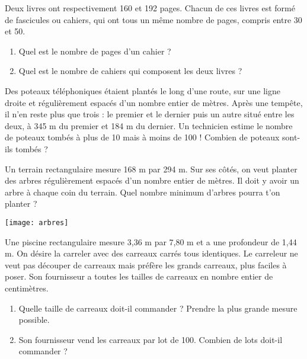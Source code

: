 \begin{exercice}[Pages]
Deux livres ont respectivement 160 et 192 pages. Chacun de ces livres est formé de fascicules ou cahiers, qui ont tous un même nombre de pages, compris entre 30 et 50.
\begin{enumerate}
 \item Quel est le nombre de pages d'un cahier ?
 \item Quel est le nombre de cahiers qui composent les deux livres ?
 \end{enumerate}
\end{exercice}


\begin{exercice}[Tempête]
Des poteaux téléphoniques étaient plantés le long d'une route, sur une ligne droite et régulièrement espacés d'un nombre entier de mètres.
Après une tempête, il n'en reste plus que trois : le premier et le dernier puis un autre situé entre les deux, à 345 m du premier et 184 m du dernier. Un technicien estime le nombre de poteaux tombés à plus de 10 mais à moins de 100 ! Combien de poteaux sont-ils tombés ?
\end{exercice}

\begin{exercice}[Arbres]
Un terrain rectangulaire mesure 168 m par 294 m. Sur ses côtés, on veut planter des arbres régulièrement espacés d'un nombre entier de mètres. Il doit y avoir un arbre à chaque coin du terrain.
Quel nombre minimum d'arbres pourra t'on planter ?
\begin{center} \texttt{[image: arbres]} \end{center}
\end{exercice}


\begin{exercice}[Piscine]
Une piscine rectangulaire mesure 3,36 m par 7,80 m et a une profondeur de 1,44 m. On désire la carreler avec des carreaux carrés tous identiques. Le carreleur ne veut pas découper de carreaux mais préfère les grands carreaux, plus faciles à poser. Son fournisseur a toutes les tailles de carreaux en nombre entier de centimètres.
\begin{enumerate}
 \item Quelle taille de carreaux doit-il commander ? Prendre la plus grande mesure possible.
 \item Son fournisseur vend les carreaux par lot de 100. Combien de lots doit-il commander ?
 \end{enumerate}
\end{exercice}


